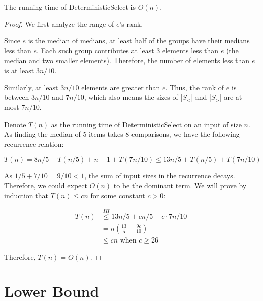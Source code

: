 \begin{theorem}
  The running time of DeterministicSelect is $O(n)$.
\end{theorem}
\begin{proof}
  We first analyze the range of $e$'s rank. 

  Since $e$ is the median of medians, at least half of the groups have their medians less than $e$. Each such group contributes at least 3 elements less than $e$ (the median and two smaller elements). Therefore, the number of elements less than $e$ is at least $3n/10$. 

  Similarly, at least $3n/10$ elements are greater than $e$. Thus, the rank of $e$ is between $3n/10$ and $7n/10$, which also means the sizes of $|S_<|$ and $|S_>|$ are at most $7n/10$.

  Denote $T(n)$ as the running time of DeterministicSelect on an input of size $n$. As finding the median of 5 items takes 8 comparisons, we have the following recurrence relation:

  \[ T(n) = 8n/5 + T(n/5) + n-1 + T(7n/10)\leq 13n/5 + T(n/5) + T(7n/10) \]

  As $1/5 + 7/10 = 9/10 < 1$, the sum of input sizes in the recurrence decays. Therefore, we could expect $O(n)$ to be the dominant term. We will prove by induction that $T(n) \leq c n$ for some constant $c > 0$:

  \begin{align*}
    T(n) &\overset{IH}{\leq} 13n/5 + c n/5 + c \cdot 7n/10 \\
         & = n\left( \frac{13}{5} + \frac{9c}{10} \right) \\
         & \leq c n \text{ when } c \geq 26
  \end{align*}

  Therefore, $T(n) = O(n)$.
\end{proof}

\section{Lower Bound}


